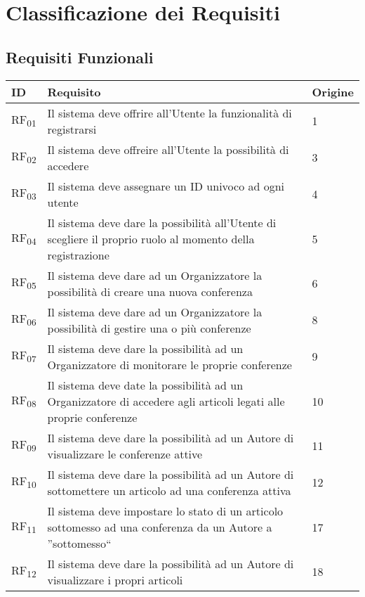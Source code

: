 \section{Classificazione dei Requisiti}
\label{sec:classificazione_requisiti}
\subsection{Requisiti Funzionali}
\label{sec:requisiti_funzionali}
\begin{tabular}{|p{1cm}|p{9cm}|p{1cm}|}
  \hline
  \rowcolor{SkyBlue}
  ID & Requisito & Origine \\
  \hline \hline
  RF\textsubscript{01} & Il sistema deve offrire all'Utente la funzionalità di registrarsi & 1\\
  \hline
  RF\textsubscript{02} & Il sistema deve offreire all'Utente la possibilità di accedere & 3\\
  \hline
  RF\textsubscript{03} & Il sistema deve assegnare un ID univoco ad ogni utente & 4\\
  \hline
  RF\textsubscript{04} & Il sistema deve dare la possibilità all'Utente di scegliere il proprio ruolo al momento della registrazione & 5 \\
  \hline
  RF\textsubscript{05} & Il sistema deve dare ad un Organizzatore la possibilità di creare una nuova conferenza& 6\\
  \hline
  RF\textsubscript{06} & Il sistema deve dare ad un Organizzatore la possibilità di gestire una o più conferenze & 8\\
  \hline
  RF\textsubscript{07} & Il sistema deve dare la possibilità ad un Organizzatore di monitorare le proprie conferenze & 9 \\
  \hline
  RF\textsubscript{08} & Il sistema deve date la possibilità ad un Organizzatore di accedere agli articoli legati alle proprie conferenze & 10 \\
  \hline
  RF\textsubscript{09} & Il sistema deve dare la possibilità ad un Autore di visualizzare le conferenze attive & 11 \\
  \hline
  RF\textsubscript{10} & Il sistema deve dare la possibilità ad un Autore di sottomettere un articolo ad una conferenza attiva & 12 \\
  \hline
  RF\textsubscript{11} & Il sistema deve impostare lo stato di un articolo sottomesso ad una conferenza da un Autore a ''sottomesso`` & 17 \\
  \hline
  RF\textsubscript{12} & Il sistema deve dare la possibilità ad un Autore di visualizzare i propri articoli & 18 \\

\end{tabular}
